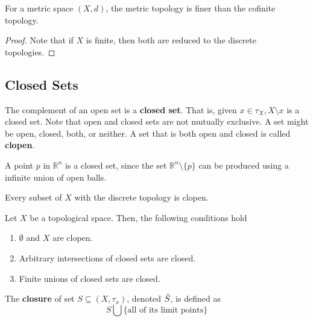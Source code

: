 \documentclass{article}
\begin{document}
      \begin{theorem}
        For a metric space $(X, d)$, the metric topology is finer than the cofinite topology. 
      \end{theorem} 
      \begin{proof}
        Note that if $X$ is finite, then both are reduced to the discrete topologies. 
      \end{proof}

  \subsection{Closed Sets} 

    \begin{definition}
      The complement of an open set is a \textbf{closed set}. That is, given $x \in \tau_{X}, X \setminus x$ is a closed set. Note that open and closed sets are not mutually exclusive. A set might be open, closed, both, or neither. A set that is both open and closed is called \textbf{clopen}.
    \end{definition}

    \begin{example}[Atoms]
      A point $p$ in $\mathbb{R}^{n}$ is a closed set, since the set $\mathbb{R}^{n} \setminus \{p\}$ can be produced using a infinite union of open balls. 
    \end{example}

    \begin{example}
      Every subset of $X$ with the discrete topology is clopen.
    \end{example}

    \begin{theorem}
      Let $X$ be a topological space. Then, the following conditions hold
      \begin{enumerate}
        \item $\emptyset$ and $X$ are clopen.
        \item Arbitrary intersections of closed sets are closed. 
        \item Finite unions of closed sets are closed. 
      \end{enumerate}
    \end{theorem}

    \begin{definition}
    The \textbf{closure} of set $S \subseteq (X, \tau_{x})$, denoted $\Bar{S}$, is defined as 
    \[ S \bigcup \{\text{all of its limit points}\} \]
    \end{definition}
\end{document}

